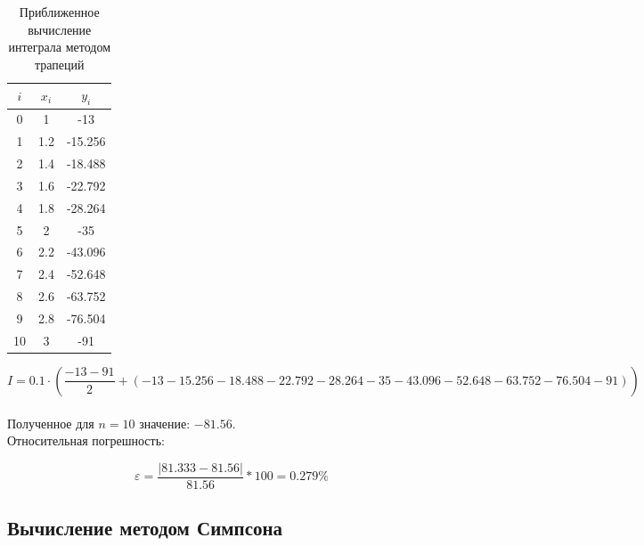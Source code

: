 \documentclass{article}
\begin{document}
       \begin{table}[H]
      	\begin{center}
      		\begin{tabular}{|c|c|c|}
	      			\hline
	      			$i$ & $x_i$ & $y_i$ \\
	      			\hline
	      			0 & 1 & -13 \\
	      			1 & 1.2 & -15.256 \\
	      			2 & 1.4 & -18.488 \\
	      			3 & 1.6 & -22.792 \\
	      			4 & 1.8 & -28.264 \\
	      			5 & 2 & -35 \\
	      			6 & 2.2 & -43.096 \\
	      			7 & 2.4 & -52.648 \\
	      			8 & 2.6 & -63.752 \\
	      			9 & 2.8 & -76.504 \\
	      			10 & 3 & -91 \\
	      			\hline
      			\end{tabular}
      		\caption{Приближенное вычисление интеграла методом трапеций}
      	\end{center}
      \end{table}
      
      \[I = 0.1\cdot \left(\frac{-13-91}{2}+(-13 -15.256 -18.488 -22.792 -28.264 -35 -43.096 -52.648 -63.752 -76.504 -91)\right)\]
      \\
      Полученное для $n=10$ значение: $-81.56$.
      \\
      Относительная погрешность: 
      
      $$\varepsilon = \frac{|81.333-81.56|}{81.56}*100=0.279\%$$
      
      \subsection{Вычисление методом Симпсона}
      
\end{document}
